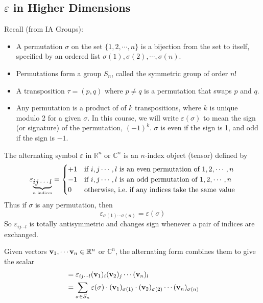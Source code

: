 \subsection{\(\varepsilon\) in Higher Dimensions}
Recall (from IA Groups):
\begin{itemize}
	\item A permutation \(\sigma\) on the set \(\{ 1, 2, \cdots, n \}\) is a bijection from the set to itself, specified by an ordered list \(\sigma(1), \sigma(2), \cdots, \sigma(n)\).
	\item Permutations form a group \(S_n\), called the symmetric group of order \(n! \)
	\item A transposition \(\tau = (p, q)\) where \(p \neq q\) is a permutation that swaps \(p\) and \(q\).
	\item Any permutation is a product of of \(k\) transpositions, where \(k\) is unique modulo 2 for a given \(\sigma\).
	      In this course, we will write \(\varepsilon(\sigma)\) to mean the sign (or signature) of the permutation, \((-1)^k\).
	      \(\sigma\) is even if the sign is 1, and odd if the sign is \(-1\).
\end{itemize}
The alternating symbol \(\varepsilon\) in \(\mathbb R^n\) or \(\mathbb C^n\) is an \(n\)-index object (tensor) defined by
\[
	\varepsilon_{\underbrace{ij\cdots l}_{\mathclap{n \text{ indices}}}} = \begin{cases}
		+1 & \text{if } i, j \cdots, l \text{ is an even permutation of } 1, 2, \cdots, n \\
		-1 & \text{if } i, j \cdots, l \text{ is an odd permutation of } 1, 2, \cdots, n  \\
		0  & \text{otherwise, i.e.\ if any indices take the same value}
	\end{cases}
\]
Thus if \(\sigma\) is any permutation, then
\[
	\varepsilon_{\sigma(1)\cdots\sigma(n)} = \varepsilon(\sigma)
\]
So \(\varepsilon_{ij\cdots l}\) is totally antisymmetric and changes sign whenever a pair of indices are exchanged.
\begin{definition}
	Given vectors \(\vb v_1, \cdots \vb v_n \in \mathbb R^n\) or \(\mathbb C^n\), the alternating form combines them to give the scalar
	\begin{align*}
		[\vb v_1, \vb v_2, \cdots, \vb v_n ] & = \varepsilon_{ij\cdots l} (\vb v_1)_i (\vb v_2)_j \cdots (\vb v_n)_l                                                            \\
		                                     & = \sum_{\sigma \in S_n} \varepsilon(\sigma) \cdot (\vb v_1)_{\sigma(1)} \cdot (\vb v_2)_{\sigma(2)} \cdots (\vb v_n)_{\sigma(n)}
	\end{align*}
\end{definition}

